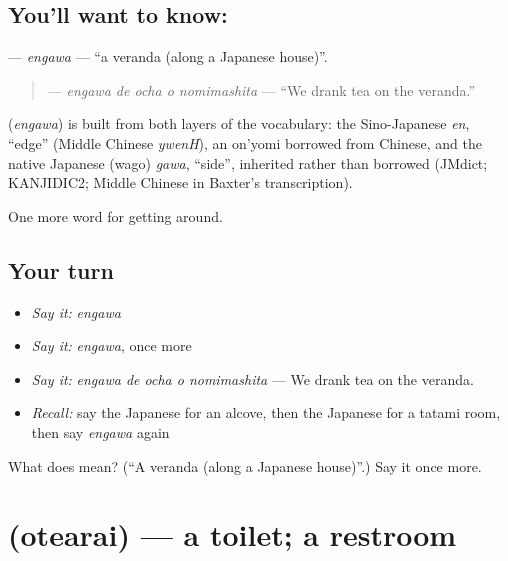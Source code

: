 \subsection*{You'll want to know: }
\textbf{} — \emph{engawa} — \textquotedblleft{}a veranda (along a Japanese house)\textquotedblright{}.

\begin{quote}
\textbf{  } — \emph{engawa de ocha o nomimashita} — \textquotedblleft{}We drank tea on the veranda.\textquotedblright{}
\end{quote}

\begin{cousinweb}
\textbf{} (\emph{engawa}) is built from both layers of the vocabulary: the Sino-Japanese \emph{en}, \textquotedblleft{}edge\textquotedblright{} (Middle Chinese \emph{ywenH}), an on'yomi borrowed from Chinese, and the native Japanese (wago) \emph{gawa}, \textquotedblleft{}side\textquotedblright{}, inherited rather than borrowed (JMdict; KANJIDIC2; Middle Chinese in Baxter's transcription).
\end{cousinweb}

\begin{grammarlens}[title={What you've built}]
One more word for getting around.
\end{grammarlens}

\subsection*{Your turn}
\begin{itemize}
\raggedright
  \item \emph{Say it:} \emph{engawa}
  \item \emph{Say it:} \emph{engawa}, once more
  \item \emph{Say it:} \emph{engawa de ocha o nomimashita} — We drank tea on the veranda.
  \item \emph{Recall:} say the Japanese for an alcove, then the Japanese for a tatami room, then say \emph{engawa} again
\end{itemize}

\begin{tcolorbox}[breakable,colback=teal!4,colframe=teal!35!black,title={Before you move on}]
What does  mean? (\textquotedblleft{}A veranda (along a Japanese house)\textquotedblright{}.) Say it once more.
\end{tcolorbox}
\section[\texorpdfstring{\ja{おてあらい} (otearai)}{おてあらい (otearai)}]{ (otearai) — a toilet; a restroom}

